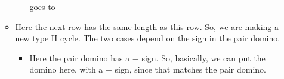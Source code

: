 \documentclass[12pt]{article}
\numberwithin{equation}{section}
\newcommand{\verticalDominoMaybeShift}[4]{\filldraw [dominoMaybeStyle] (#2 - 1 + #4 + \eps,  #1 - 1 + \eps) rectangle + (1 - \teps,2 -\teps) node [dominoText] {$#3$};}
\begin{document}
\begin{itemize}
\begin{itemize}
\begin{itemize}
\begin{figure}[H]
        \end{figure}
        goes to
        \begin{figure}[H]
          \centering
        \end{figure}
        \begin{figure}[H]
          \centering
        \end{figure}
      \end{itemize}
      \item  Here the next row has the same length as this row.
      So, we are making a new type II cycle.
      The two cases depend on the sign in the pair domino.
      \begin{itemize}
        \item Here the pair domino has a $-$ sign.
        So, basically, we can put the domino here, with a $+$ sign, since that matches the pair domino.

\end{itemize}
\end{itemize}
\end{itemize}
\end{document}
